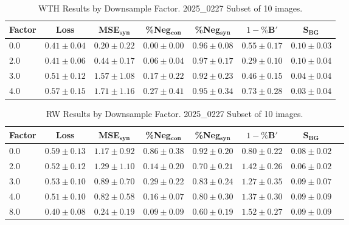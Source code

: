 \begin{table}[h]
\centering
\small
\begin{tabular}{lcccccc}
\hline
Factor & Loss & MSE$_{\mathbf{syn}}$ & \%Neg$_{\mathbf{con}}$ & \%Neg$_{\mathbf{syn}}$ & $1-\%\mathbf{B}'$ & $\mathbf{S}_{\mathbf{BG}}$ \\
\hline
0.0 & $0.41 \pm 0.04$ & $0.20 \pm 0.22$ & $0.00 \pm 0.00$ & $0.96 \pm 0.08$ & $0.55 \pm 0.17$ & $0.10 \pm 0.03$ \\
2.0 & $0.41 \pm 0.06$ & $0.44 \pm 0.17$ & $0.06 \pm 0.04$ & $0.97 \pm 0.17$ & $0.29 \pm 0.10$ & $0.10 \pm 0.04$ \\
3.0 & $0.51 \pm 0.12$ & $1.57 \pm 1.08$ & $0.17 \pm 0.22$ & $0.92 \pm 0.23$ & $0.46 \pm 0.15$ & $0.04 \pm 0.04$ \\
4.0 & $0.57 \pm 0.15$ & $1.71 \pm 1.16$ & $0.27 \pm 0.41$ & $0.95 \pm 0.34$ & $0.73 \pm 0.28$ & $0.03 \pm 0.04$ \\
\hline
\end{tabular}
\caption{WTH Results by Downsample Factor. 2025\_0227 Subset of 10 images.}
\label{tab:downsample_wth}
\end{table}

\begin{table}[h]
\centering
\small
\begin{tabular}{lccccccc}
\hline
Factor & Loss & MSE$_{\mathbf{syn}}$ & \%Neg$_{\mathbf{con}}$ & \%Neg$_{\mathbf{syn}}$ & $1-\%\mathbf{B}'$ & $\mathbf{S}_{\mathbf{BG}}$ \\
\hline
0.0 & $0.59 \pm 0.13$ & $1.17 \pm 0.92$ & $0.86 \pm 0.38$ & $0.92 \pm 0.20$ & $0.80 \pm 0.22$ & $0.08 \pm 0.02$ \\
2.0 & $0.52 \pm 0.12$ & $1.29 \pm 1.10$ & $0.14 \pm 0.20$ & $0.70 \pm 0.21$ & $1.42 \pm 0.26$ & $0.06 \pm 0.02$ \\
3.0 & $0.53 \pm 0.10$ & $0.89 \pm 0.70$ & $0.29 \pm 0.22$ & $0.83 \pm 0.24$ & $1.27 \pm 0.35$ & $0.09 \pm 0.07$ \\
4.0 & $0.51 \pm 0.10$ & $0.82 \pm 0.58$ & $0.16 \pm 0.07$ & $0.80 \pm 0.30$ & $1.37 \pm 0.30$ & $0.09 \pm 0.09$ \\
8.0 & $0.40 \pm 0.08$ & $0.24 \pm 0.19$ & $0.09 \pm 0.09$ & $0.60 \pm 0.19$ & $1.52 \pm 0.27$ & $0.09 \pm 0.09$ \\
\hline
\end{tabular}
\caption{RW Results by Downsample Factor. 2025\_0227 Subset of 10 images.}
\label{tab:downsample_rw}
\end{table}



